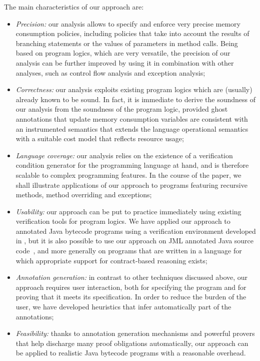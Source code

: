 The main characteristics of our approach are:
\begin{itemize}
\item \emph{Precision:} our analysis allows to specify and enforce
very precise memory consumption policies, including policies that take
into account the results of branching statements or the values of
parameters in method calls. Being based on program logics, which are
very versatile, the precision of our analysis can be further improved
by using it in combination with other analyses, such as control flow
analysis and exception analysis;


\item \emph{Correctness:} our analysis exploits existing program logics
which are (usually) already known to be sound. In fact, it is immediate
to derive the soundness of our analysis from the soundness of the program
logic, provided ghost annotations that update memory consumption variables
are consistent with an instrumented semantics that  extends the language
operational semantics with a suitable cost model that reflects resource
usage;

\item \emph{Language coverage:} our analysis relies on the existence
of a verification condition generator for the programming language at
hand, and is therefore scalable to complex programming features.  In
the course of the paper, we shall illustrate applications of our
approach to programs featuring recursive methods, method
overriding and exceptions;


\item \emph{Usability:} our approach can be put to practice
immediately using existing verification tools for program logics. We
have applied our approach to annotated Java bytecode programs using a
verification environment developed in \cite{LM05:acc}, but it is also possible to use our approach on
JML annotated Java source code~\cite{BRL03:fme}, and more generally on
programs that are written in a language for which appropriate support
for contract-based reasoning exists;



\item \emph{Annotation generation:} in contrast to other techniques
discussed above, our approach requires user interaction, both for
specifying the program and for proving that it meets its specification.
In order to reduce the burden of the user, we have developed heuristics
that infer automatically part of the annotations;


\item \emph{Feasibility:} thanks to annotation generation mechanisms
and powerful provers that help discharge many proof obligations
automatically, our approach can be applied to realistic Java bytecode
programs with a reasonable overhead.
\end{itemize}
